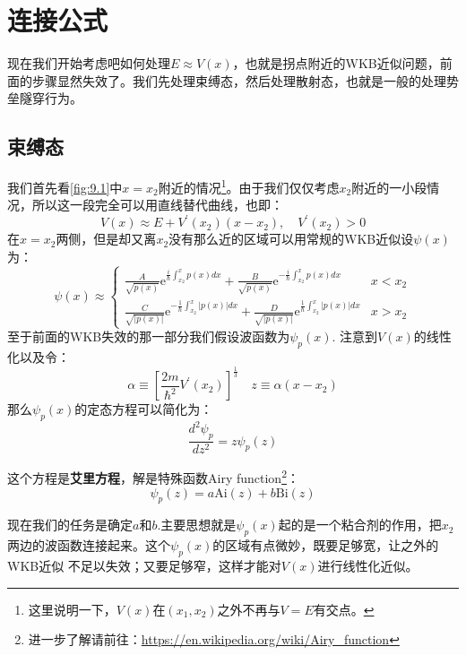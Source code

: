 \documentclass[a4paper,zihao=-4,linespread=1]{ctexrep}
\begin{document}
    \section{连接公式}
    现在我们开始考虑吧如何处理$E\approx V(x)$，也就是拐点附近的WKB近似问题，前面的步骤显然失效了。我们先处理束缚态，然后处理散射态，也就是一般的处理势垒隧穿行为。

    \subsection*{束缚态}
    我们首先看\ref{fig:9.1}中$x=x_2$附近的情况\footnote{这里说明一下，$V(x)$在$(x_1,x_2)$之外不再与$V=E$有交点。}。由于我们仅仅考虑$x_2$附近的一小段情况，所以这一段完全可以用直线替代曲线，也即：
    \[V(x)\approx E+V^\prime(x_2)(x-x_2),\quad V^\prime(x_2)>0\]
    在$x=x_2$两侧，但是却又离$x_2$没有那么近的区域可以用常规的WKB近似设$\psi(x)$为：
    \begin{equation}
        \label{eq:9.10}
        \psi(x)\approx\begin{cases}
            \frac{A}{\sqrt{p(x)}}\mathrm{e}^{\frac{i}{\hbar}\int_{x_2}^{x}p(x)dx}+\frac{B}{\sqrt{p(x)}}\mathrm{e}^{-\frac{i}{\hbar}\int_{x_2}^{x}p(x)dx}&x<x_2\\
            \frac{C}{\sqrt{|p(x)|}}\mathrm{e}^{-\frac{1}{\hbar}\int_{x_2}^{x}|p(x)|dx}+\frac{D}{\sqrt{|p(x)|}}\mathrm{e}^{\frac{1}{\hbar}\int_{x_2}^{x}|p(x)|dx}&x>x_2
        \end{cases}
    \end{equation}
    至于前面的WKB失效的那一部分我们假设波函数为$\psi_p(x)$. 注意到$V(x)$的线性化以及令：
    \begin{equation}
        \alpha\equiv\left[\frac{2m}{\hbar^2}V^\prime(x_2)\right]^\frac{1}{3}\quad z\equiv\alpha(x-x_2)
    \end{equation}
    那么$\psi_p(x)$的定态方程可以简化为：
    \begin{equation}
        \frac{d^2\psi_p}{dz^2}=z\psi_p(z)
    \end{equation}
    
    这个方程是\textbf{艾里方程}，解是特殊函数Airy function\footnote{进一步了解请前往：\url{https://en.wikipedia.org/wiki/Airy_function}}：
    \[\psi_p(z)=a\mathrm{Ai}(z)+b\mathrm{Bi}(z)\]
    
    现在我们的任务是确定$a$和$b$.主要思想就是$\psi_p(x)$起的是一个粘合剂的作用，把$x_2$两边的波函数连接起来。这个$\psi_p(x)$的区域有点微妙，既要足够宽，让之外的WKB近似
    不足以失效；又要足够窄，这样才能对$V(x)$进行线性化近似。
\end{document}
